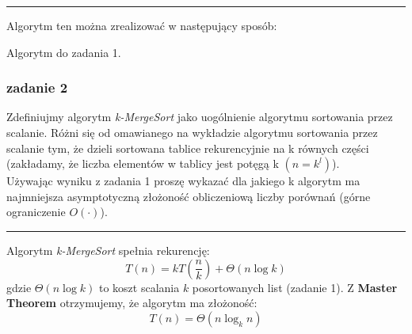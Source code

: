 \documentclass[11pt,a4paper]{article}
\begin{document}
\bigskip
\hrule
\bigskip

Algorytm ten można zrealizować w następujący sposób:
\begin{algorithm}
    \caption{Algorytm do zadania 1.}
    \begin{algorithmic}[1]
        \EndFor
        \EndFor
        \EndProcedure
    \end{algorithmic}
\end{algorithm}

\subsubsection{zadanie 2}
Zdefiniujmy algorytm \textit{k-MergeSort} jako uogólnienie algorytmu sortowania przez scalanie. Różni się od omawianego na wykładzie algorytmu sortowania przez scalanie tym, że dzieli sortowana tablice rekurencyjnie na k równych części (zakładamy, że liczba elementów w tablicy jest potęgą k $(n = k^l)$). \\
Używając wyniku z zadania 1 proszę wykazać dla jakiego k algorytm ma najmniejsza asymptotyczną złożoność obliczeniową liczby porównań (górne ograniczenie $O(\cdot)$).

\bigskip
\hrule
\bigskip

Algorytm \textit{k-MergeSort} spełnia rekurencję:
\[
    T(n) = kT(\frac{n}{k}) + \Theta(n \log k)
\]
gdzie $\Theta(n \log k)$ to koszt scalania $k$ posortowanych list (zadanie 1). Z \textbf{Master Theorem} otrzymujemy, że algorytm ma złożoność:
\[
    T(n) = \Theta(n \log_k n)
\]
\end{document}
